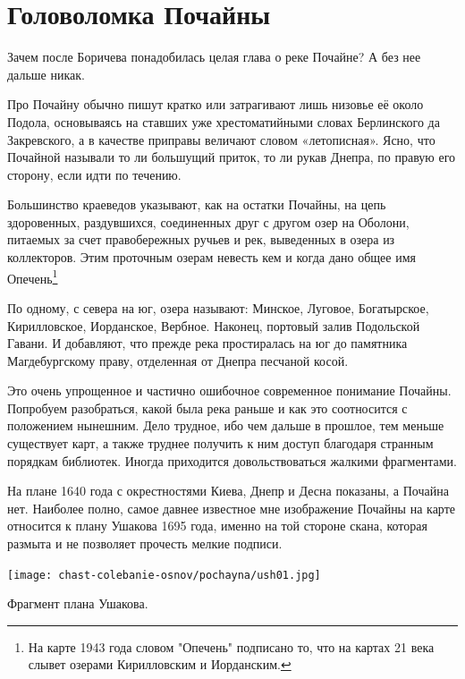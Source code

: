 \chapter{Головоломка Почайны}

Зачем после Боричева понадобилась целая глава о реке Почайне? А без нее дальше никак.

Про Почайну обычно пишут кратко или затрагивают лишь низовье её около Подола, основываясь на ставших уже хрестоматийными словах Берлинского да Закревского, а в качестве приправы величают словом «летописная». Ясно, что Почайной называли то ли большущий приток, то ли рукав Днепра, по правую его сторону, если идти по течению.

Большинство краеведов указывают, как на остатки Почайны, на цепь здоровенных, раздувшихся, соединенных друг с другом озер на Оболони, питаемых за счет правобережных ручьев и рек, выведенных в озера из коллекторов. Этим проточным озерам невесть кем и когда дано общее имя Опечень\footnote{ На карте 1943 года словом "Опечень" подписано то, что на картах 21 века слывет озерами Кирилловским и Иорданским.}

По одному, с севера на юг, озера называют: Минское, Луговое, Богатырское, Кирилловское, Иорданское, Вербное. Наконец, портовый залив Подольской Гавани. И добавляют, что прежде река простиралась на юг до памятника Магдебургскому праву, отделенная от Днепра песчаной косой.

Это очень упрощенное и частично ошибочное современное понимание Почайны. Попробуем разобраться, какой была река раньше и как это соотносится с положением нынешним. Дело трудное, ибо чем дальше в прошлое, тем меньше существует карт, а также труднее получить к ним доступ благодаря странным порядкам библиотек. Иногда приходится довольствоваться жалкими фрагментами. 

На плане 1640 года с окрестностями Киева, Днепр и Десна показаны, а Почайна нет. Наиболее полно, самое давнее известное мне изображение Почайны на карте относится к плану Ушакова 1695 года, именно на той стороне скана, которая размыта и не позволяет прочесть мелкие подписи.


\begin{center}
\texttt{[image: chast-colebanie-osnov/pochayna/ush01.jpg]}

Фрагмент плана Ушакова.\\
\end{center}

